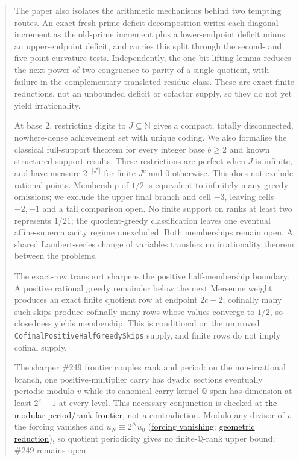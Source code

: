 \documentclass[11pt]{article}
\newcommand{\commit}{99f4bf47422abbd8757cbb22b50ba079d764d3a7}
\newcommand{\repobase}{https://github.com/wcook04/plectis-erdos/blob/\commit}
\newcommand{\PK}{Erdos249257}
\newcommand{\lword}[4]{\href{\repobase/\PK/#1\#L#2}{#4}}
\theoremstyle{definition}
\theoremstyle{remark}
\newcommand{\N}{\mathbb{N}}
\begin{document}
\begin{abstract}
The paper also isolates the arithmetic mechanisms behind two tempting routes.
An exact fresh-prime deficit decomposition writes each diagonal increment as
the old-prime increment plus a lower-endpoint deficit minus an upper-endpoint
deficit, and carries this split through the second- and five-point curvature
tests.  Independently, the one-bit lifting lemma reduces the next power-of-two
congruence to parity of a single quotient, with failure in the complementary
translated residue class.  These are exact finite reductions, not an
unbounded deficit or cofactor supply, so they do not yet yield irrationality.

At base $2$, restricting digits to $J\subseteq\N$ gives a compact, totally
disconnected, nowhere-dense achievement set with unique coding.  We also
formalise the classical full-support theorem for every integer base $b\ge2$
and known structured-support results.  These restrictions are perfect when
$J$ is infinite, and have measure $2^{-|J^c|}$ for finite $J^c$ and $0$
otherwise.  This does not exclude
rational points. Membership of $1/2$ is equivalent to infinitely many greedy
omissions; we exclude the upper final branch and cell $-3$, leaving cells
$-2,-1$ and a tail comparison open. No finite support on ranks at least two
represents $1/21$; the quotient-greedy classification leaves one eventual
affine-supercapacity regime unexcluded. Both memberships remain open. A
shared Lambert-series change of variables transfers no irrationality theorem
between the problems.

The exact-row transport sharpens the positive half-membership boundary.  A
positive rational greedy remainder below the next Mersenne weight produces
an exact finite quotient row at endpoint $2c-2$; cofinally many such skips
produce cofinally many rows whose values converge to $1/2$, so closedness
yields membership.  This is conditional on the unproved
\texttt{CofinalPositiveHalfGreedySkips} supply, and finite rows do not imply
cofinal supply.

The sharper \#249 frontier couples rank and period: on the non-irrational
branch, one positive-multiplier carry has dyadic sections eventually periodic
modulo $v$ while its canonical carry-kernel $\mathbb Q$-span has dimension at
least $2^e-1$ at every level.  This necessary conjunction is checked at
\lword{TotientTailCarryPeriod.lean}{224}{not_irrational_totientSeries_implies_mod_period_and_unbounded_rank}{the modular-period/rank frontier},
not a contradiction.  Modulo any divisor of $v$ the forcing vanishes and
$u_N\equiv2^Nu_0$
(\lword{TotientTailCarryPeriod.lean}{126}{totient_forcing_vanishes_mod_of_dvd_multiplier}{forcing vanishing};
\lword{TotientTailCarryPeriod.lean}{140}{totient_carry_modEq_geometric_of_dvd_multiplier}{geometric reduction}),
so quotient periodicity gives no finite-$\mathbb Q$-rank upper bound; \#249
remains open.

\end{abstract}
\end{document}
